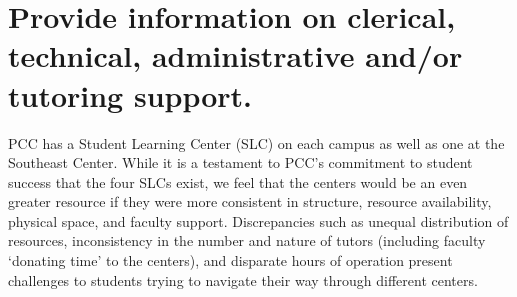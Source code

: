 


\section[Clerical, technical, administrative and/or tutoring support]{Provide information on clerical, technical, administrative and/or tutoring support.}


PCC has a Student Learning Center (SLC) on each campus as well as one at  the
Southeast Center.  While it is a testament to PCC's commitment to student
success that the four SLCs exist, we feel that the centers would be an even
greater resource if they were more consistent in structure, resource
availability, physical space, and faculty support.  Discrepancies such as
unequal distribution of resources, inconsistency in the number and nature of
tutors (including faculty `donating time' to the centers), and disparate hours
of operation present challenges to students trying to navigate their way
through different centers. 

